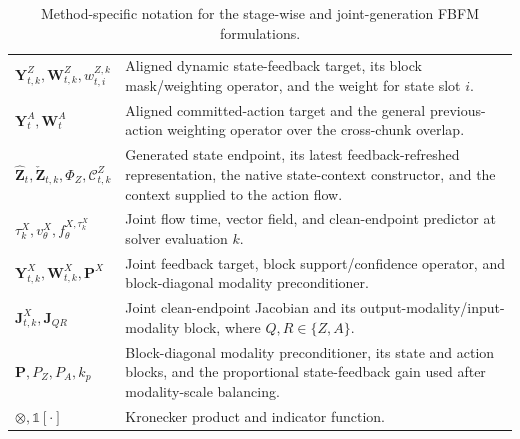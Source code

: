 \begin{table}[H]
\begin{tabular}{p{} p{}}
        $\mathbf Y_{t,k}^Z,\mathbf W_{t,k}^Z,w_{t,i}^{Z,k}$
        & Aligned dynamic state-feedback target, its block mask/weighting operator, and the weight for state slot $i$.\\
        $\mathbf Y_t^A,\mathbf W_t^A$
        & Aligned committed-action target and the general previous-action weighting operator over the cross-chunk overlap.\\
        $\hat{\mathbf Z}_t,\check{\mathbf Z}_{t,k},\Phi_Z,\mathcal C_{t,k}^Z$
        & Generated state endpoint, its latest feedback-refreshed representation, the native state-context constructor, and the context supplied to the action flow.\\
        $\tau_k^X,v_\theta^X,f_\theta^{X,\tau_k^X}$
        & Joint flow time, vector field, and clean-endpoint predictor at solver evaluation $k$.\\
        $\mathbf Y_{t,k}^X,\mathbf W_{t,k}^X,\mathbf P^X$
        & Joint feedback target, block support/confidence operator, and block-diagonal modality preconditioner.\\
        $\mathbf J_{t,k}^X,\mathbf J_{QR}$
        & Joint clean-endpoint Jacobian and its output-modality/input-modality block, where $Q,R\in\{Z,A\}$.\\
        $\mathbf P,P_Z,P_A,k_p$
        & Block-diagonal modality preconditioner, its state and action blocks, and the proportional state-feedback gain used after modality-scale balancing.\\
        $\otimes,\mathbb 1[\cdot]$
        & Kronecker product and indicator function.\\
        \hline
    \end{tabular}
    \caption{Method-specific notation for the stage-wise and joint-generation FBFM formulations.}
    \label{tab:method-notation}
\end{table}

